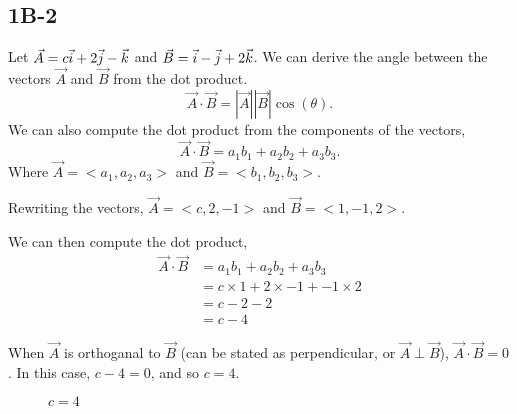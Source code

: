 \documentclass[main.tex]{subfiles}
\begin{document}
\subsection*{1B-2}

Let $\vec{A} = c\vec{i} + 2\vec{j} - \vec{k}$ and $\vec{B} = \vec{i} - \vec{j} + 2\vec{k}$.
We can derive the angle between the vectors $\vec{A}$ and $\vec{B}$ from the dot
product. \[\vec{A}\cdot\vec{B} = |\vec{A}||\vec{B}|\cos(\theta).\]
We can also compute the dot product from the components of the vectors,
\[\vec{A}\cdot\vec{B} = a_1 b_1 + a_2 b_2 + a_3 b_3.\]
Where $\vec{A} = <a_1, a_2, a_3>$ and $\vec{B} = <b_1, b_2, b_3>$.

Rewriting the vectors, $\vec{A} = <c, 2, -1>$ and $\vec{B} = <1, -1, 2>$.

We can then compute the dot product, 
\begin{align*}
\vec{A}\cdot\vec{B} &= a_1 b_1 + a_2 b_2 + a_3 b_3\\
                    &= c\times1 + 2\times-1 + -1\times2\\
                    &= c - 2 - 2\\
                    &= c - 4
\end{align*}

When $\vec{A}$ is orthoganal to $\vec{B}$ (can be stated as perpendicular, 
or $\vec{A}\perp\vec{B}$), $\vec{A}\cdot\vec{B} = 0$. In this case, $c-4 = 0$, 
and so $c = 4$.

\begin{figure}[h]
\centering
\usetikzlibrary{perspective}
\caption{$c= 4$}
\end{figure}
\end{document}
